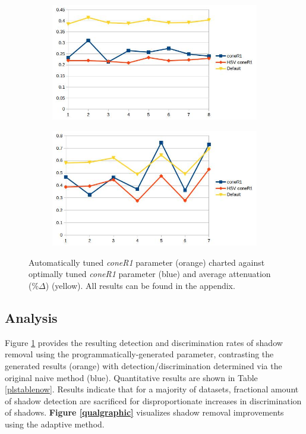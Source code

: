 \documentclass[12pt]{report}
\begin{document}
\begin{figure}
  \centering
  \begin{subfigure}{1\linewidth}
  \includegraphics[width=1\linewidth]{figures/model/highway1_calc_coneR1.jpg}
  \caption{}
\end{subfigure}
\hfill
\begin{subfigure}{1\linewidth}
  \includegraphics[width=1\linewidth]{figures/model/highway3_calc_coneR1.jpg}
  \caption{}
\end{subfigure}

\caption{Automatically tuned \textit{coneR1} parameter (orange) charted against optimally tuned \textit{coneR1} parameter (blue) and average attenuation (\%$\Delta$) (yellow). All results can be found in the appendix.}
\label{fig:new_coneR1}
\end{figure}

\subsection{Analysis}

Figure \ref{fig:new_coneR1} provides the resulting detection and discrimination rates of shadow removal using the programmatically-generated parameter, contrasting the generated results (orange) with detection/discrimination determined via the original naive method (blue). Quantitative results are shown in Table \ref{plstablenow}. Results indicate that for a majority of datasets, fractional amount of shadow detection are sacrificed for disproportionate increases in discrimination of shadows. \textbf{Figure \ref{qualgraphic}} visualizes shadow removal improvements using the adaptive method.
\end{document}
